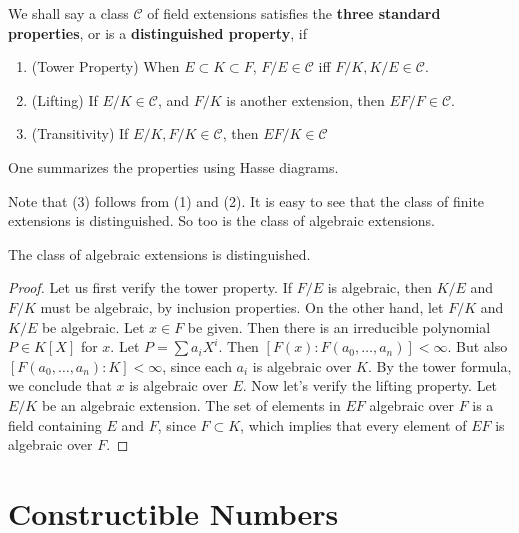 We shall say a class $\mathcal{C}$ of field extensions satisfies the {\bf three standard properties}, or is a {\bf distinguished property}, if
%
\begin{enumerate}
    \item (Tower Property) When $E \subset K \subset F$, $F/E \in \mathcal{C}$ iff $F/K,K/E \in \mathcal{C}$.
    \item (Lifting) If $E/K \in \mathcal{C}$, and $F/K$ is another extension, then $EF/F \in \mathcal{C}$.
    \item (Transitivity) If $E/K, F/K \in \mathcal{C}$, then $EF/K \in \mathcal{C}$
\end{enumerate}
%
One summarizes the properties using Hasse diagrams.
%
\begin{center}
\end{center}
%
Note that (3) follows from (1) and (2). It is easy to see that the class of finite extensions is distinguished. So too is the class of algebraic extensions.

\begin{theorem}
    The class of algebraic extensions is distinguished.
\end{theorem}
\begin{proof}
    Let us first verify the tower property. If $F/E$ is algebraic, then $K/E$ and $F/K$ must be algebraic, by inclusion properties. On the other hand, let $F/K$ and $K/E$ be algebraic. Let $x \in F$ be given. Then there is an irreducible polynomial $P \in K[X]$ for $x$. Let $P = \sum a_i X^i$. Then $[F(x): F(a_0, \dots, a_n)] < \infty$. But also $[F(a_0, \dots, a_n): K] < \infty$, since each $a_i$ is algebraic over $K$. By the tower formula, we conclude that $x$ is algebraic over $E$. Now let's verify the lifting property. Let $E/K$ be an algebraic extension. The set of elements in $EF$ algebraic over $F$ is a field containing $E$ and $F$, since $F \subset K$, which implies that every element of $EF$ is algebraic over $F$.
\end{proof}

\section{Constructible Numbers}

